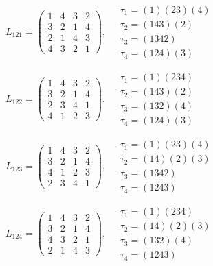 $L_{121} = \begin{pmatrix} 1 & 4 & 3 & 2 \\ 3 & 2 & 1 & 4 \\ 2 & 1 & 4 & 3 \\ 4 & 3 & 2 & 1 \end{pmatrix}, \quad \begin{matrix} \tau_{1} = (1)(2 3)(4) \\ \tau_{2} = (1 4 3)(2) \\ \tau_{3} = (1 3 4 2) \\ \tau_{4} = (1 2 4)(3) \end{matrix}$

$L_{122} = \begin{pmatrix} 1 & 4 & 3 & 2 \\ 3 & 2 & 1 & 4 \\ 2 & 3 & 4 & 1 \\ 4 & 1 & 2 & 3 \end{pmatrix}, \quad \begin{matrix} \tau_{1} = (1)(2 3 4) \\ \tau_{2} = (1 4 3)(2) \\ \tau_{3} = (1 3 2)(4) \\ \tau_{4} = (1 2 4)(3) \end{matrix}$

$L_{123} = \begin{pmatrix} 1 & 4 & 3 & 2 \\ 3 & 2 & 1 & 4 \\ 4 & 1 & 2 & 3 \\ 2 & 3 & 4 & 1 \end{pmatrix}, \quad \begin{matrix} \tau_{1} = (1)(2 3)(4) \\ \tau_{2} = (1 4)(2)(3) \\ \tau_{3} = (1 3 4 2) \\ \tau_{4} = (1 2 4 3) \end{matrix}$

$L_{124} = \begin{pmatrix} 1 & 4 & 3 & 2 \\ 3 & 2 & 1 & 4 \\ 4 & 3 & 2 & 1 \\ 2 & 1 & 4 & 3 \end{pmatrix}, \quad \begin{matrix} \tau_{1} = (1)(2 3 4) \\ \tau_{2} = (1 4)(2)(3) \\ \tau_{3} = (1 3 2)(4) \\ \tau_{4} = (1 2 4 3) \end{matrix}$

